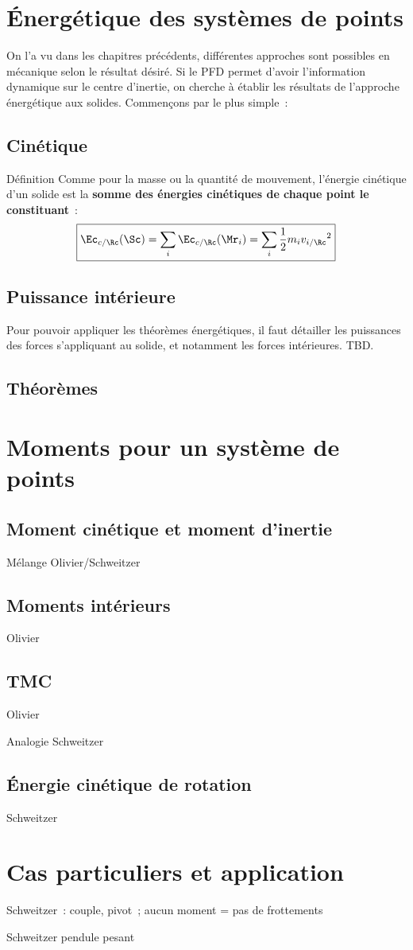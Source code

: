 \documentclass[../main/main.tex]{subfiles}
\begin{document}
\section{Énergétique des systèmes de points}
On l'a vu dans les chapitres précédents, différentes approches sont possibles en
mécanique selon le résultat désiré. Si le PFD permet d'avoir l'information
dynamique sur le centre d'inertie, on cherche à établir les résultats de
l'approche énergétique aux solides. Commençons par le plus simple~:
\subsection{Cinétique}
\begin{tdefi}{Définition}
    Comme pour la masse ou la quantité de mouvement, l'énergie cinétique d'un
    solide est la \textbf{somme des énergies cinétiques de chaque point le
    constituant}~:
    \[
        \boxed{\Ec_{c/\Rc}(\Sc) = \sum_i\Ec_{c/\Rc}(\Mr_i) = \sum_i
        \frac{1}{2}m_iv_{i/\Rc}{}^2}
    \]
\end{tdefi}

\subsection{Puissance intérieure}
Pour pouvoir appliquer les théorèmes énergétiques, il faut détailler les
puissances des forces s'appliquant au solide, et notamment les forces
intérieures. TBD.

\subsection{Théorèmes}

\section{Moments pour un système de points}
\subsection{Moment cinétique et moment d'inertie}
Mélange Olivier/Schweitzer

\subsection{Moments intérieurs}
Olivier

\subsection{TMC}
Olivier

Analogie Schweitzer

\subsection{Énergie cinétique de rotation}
Schweitzer

\section{Cas particuliers et application}
Schweitzer~: couple, pivot~; aucun moment = pas de frottements

Schweitzer pendule pesant
\end{document}
